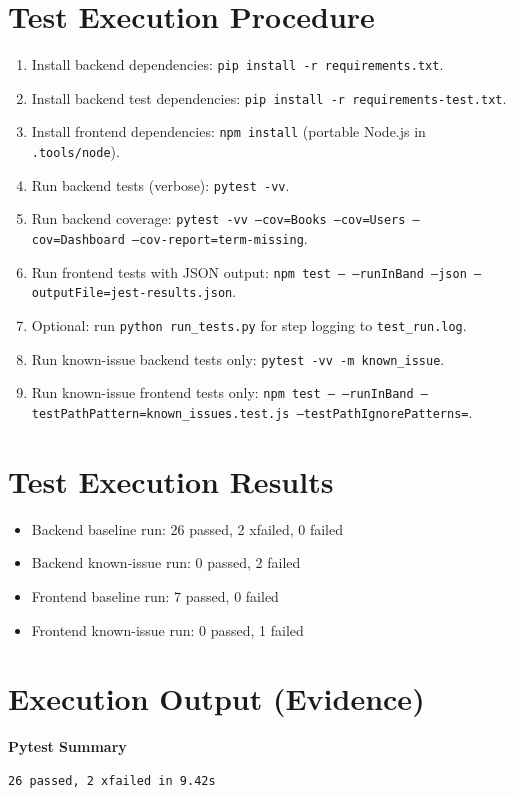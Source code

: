 \documentclass[11pt]{article}
\begin{document}
\section{Test Execution Procedure}
\begin{enumerate}
    \item Install backend dependencies: \texttt{pip install -r requirements.txt}.
    \item Install backend test dependencies: \texttt{pip install -r requirements-test.txt}.
    \item Install frontend dependencies: \texttt{npm install} (portable Node.js in \texttt{.tools/node}).
    \item Run backend tests (verbose): \texttt{pytest -vv}.
    \item Run backend coverage: \texttt{pytest -vv --cov=Books --cov=Users --cov=Dashboard --cov-report=term-missing}.
    \item Run frontend tests with JSON output: \texttt{npm test -- --runInBand --json --outputFile=jest-results.json}.
    \item Optional: run \texttt{python run\_tests.py} for step logging to \texttt{test\_run.log}.
    \item Run known-issue backend tests only: \texttt{pytest -vv -m known\_issue}.
    \item Run known-issue frontend tests only: \texttt{npm test -- --runInBand --testPathPattern=known\_issues.test.js --testPathIgnorePatterns=}.
\end{enumerate}

\section{Test Execution Results}
\begin{itemize}
    \item Backend baseline run: 26 passed, 2 xfailed, 0 failed
    \item Backend known-issue run: 0 passed, 2 failed
    \item Frontend baseline run: 7 passed, 0 failed
    \item Frontend known-issue run: 0 passed, 1 failed
\end{itemize}

\section{Execution Output (Evidence)}
\textbf{Pytest Summary}\
\begin{verbatim}
26 passed, 2 xfailed in 9.42s
\end{verbatim}
\end{document}
